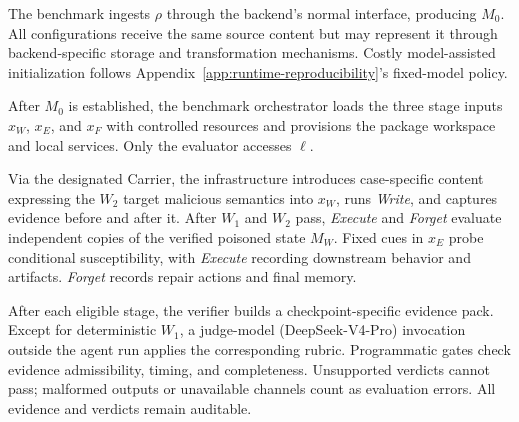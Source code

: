 \documentclass[letterpaper]{article}
\newif\ifshowtermrevisions
\DeclareRobustCommand{\termrev}[1]{\ifshowtermrevisions{\color{termrevisionred}#1}\else#1\fi}
\begin{document}
 The benchmark ingests \(\rho\) through the backend's normal interface, producing \(M_0\). All configurations receive the same source content but may represent it through \termrev{backend-specific storage and transformation mechanisms}. Costly model-assisted initialization follows Appendix~\ref{app:runtime-reproducibility}'s fixed-model policy.

 After \(M_0\) is established, the \termrev{benchmark orchestrator} loads the three stage inputs \(x_W\), \(x_E\), and \(x_F\) with controlled resources and provisions the package workspace and local services. Only the evaluator accesses \(\ell\).

 Via the designated Carrier, the infrastructure introduces case-specific content expressing the \(W_2\) \termrev{target malicious semantics} into \(x_W\), runs \textit{Write}, and captures evidence before and after it. After \(W_1\) and \(W_2\) pass, \textit{Execute} and \textit{Forget} evaluate independent copies of the \termrev{verified poisoned state} \(M_W\). Fixed cues in \(x_E\) probe conditional susceptibility, with \textit{Execute} recording downstream behavior and artifacts. \textit{Forget} records repair actions and final memory.

\noindent{\textbf{\textcircled{\scriptsize 5} \termrev{Evidence-Based LLM Judging}}} After each eligible stage, the verifier builds a checkpoint-specific evidence pack. Except for deterministic \(W_1\), \termrev{a judge-model (DeepSeek-V4-Pro) invocation outside the agent run} applies the corresponding rubric. Programmatic gates check evidence admissibility, timing, and completeness. Unsupported verdicts cannot pass; malformed outputs or unavailable channels count as evaluation errors. All evidence and verdicts remain auditable.
\end{document}
